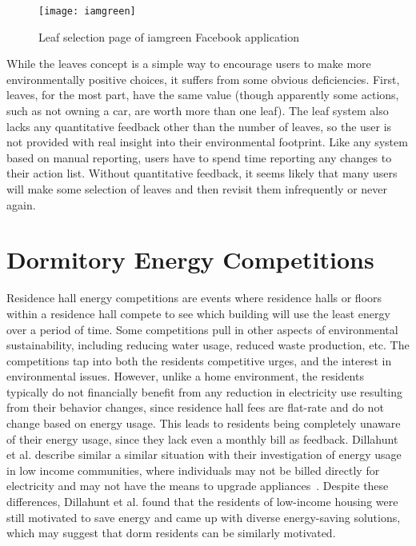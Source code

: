 \begin{figure}[htbp]
	\centering
		\texttt{[image: iamgreen]}
		\caption{Leaf selection page of iamgreen Facebook application}
		\label{fig:iamgreen}
\end{figure}

While the leaves concept is a simple way to encourage users to make more environmentally positive choices, it suffers from some obvious deficiencies. First, leaves, for the most part, have the same value (though apparently some actions, such as not owning a car, are worth more than one leaf). The leaf system also lacks any quantitative feedback other than the number of leaves, so the user is not provided with real insight into their environmental footprint. Like any system based on manual reporting, users have to spend time reporting any changes to their action list. Without quantitative feedback, it seems likely that many users will make some selection of leaves and then revisit them infrequently or never again.


\section{Dormitory Energy Competitions}
\label{sec:dorm-energy-competitions}

Residence hall energy competitions are events where residence halls or floors within a residence hall compete to see which building will use the least energy over a period of time. Some competitions pull in other aspects of environmental sustainability, including reducing water usage, reduced waste production, etc. The competitions tap into both the residents competitive urges, and the interest in environmental issues. However, unlike a home environment, the residents typically do not financially benefit from any reduction in electricity use resulting from their behavior changes, since residence hall fees are flat-rate and do not change based on energy usage. This leads to residents being completely unaware of their energy usage, since they lack even a monthly bill as feedback. Dillahunt et al. describe similar a similar situation with their investigation of energy usage in low income communities, where individuals may not be billed directly for electricity and may not have the means to upgrade appliances~\cite{Dillahunt2009-low-income}. Despite these differences, Dillahunt et al. found that the residents of low-income housing were still motivated to save energy and came up with diverse energy-saving solutions, which may suggest that dorm residents can be similarly motivated.

